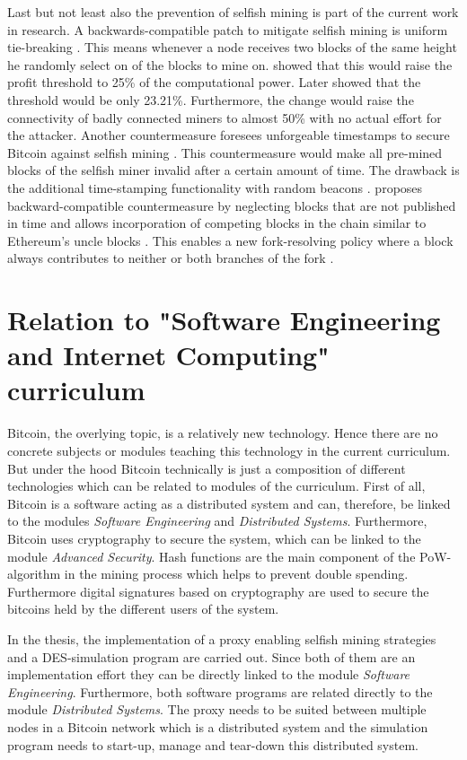 \documentclass{scrartcl}
\begin{document}
Last but not least also the prevention of selfish mining is part of the current work in research\cite{eyal2014majority, billah2015one, solat2016zeroblock, zhang2017publish}. A backwards-compatible patch to mitigate selfish mining is uniform tie-breaking \cite{eyal2014majority}. This means whenever a node receives two blocks of the same height he randomly select on of the blocks to mine on. \citep{eyal2014majority} showed that this would raise the profit threshold to 25\% of the computational power. Later \citep{sapirshtein2016optimal} showed that the threshold would be only 23.21\%. Furthermore, the change would raise the connectivity of badly connected miners to almost 50\% with no actual effort for the attacker. Another countermeasure foresees unforgeable timestamps to secure Bitcoin against selfish mining \citep{billah2015one}. This countermeasure would make all pre-mined blocks of the selfish miner invalid after a certain amount of time. The drawback is the additional time-stamping functionality with random beacons \citep{billah2015one}. \cite{zhang2017publish} proposes backward-compatible countermeasure by neglecting blocks that are not published in time and allows incorporation of competing blocks in the chain similar to Ethereum's uncle blocks \cite{Ethereum}. This enables a new fork-resolving policy where a block always contributes to neither or both branches of the fork \cite{zhang2017publish}.

\section{Relation to "Software Engineering and Internet Computing" curriculum}
Bitcoin, the overlying topic, is a relatively new technology. Hence there are no concrete subjects or modules teaching this technology in the current curriculum. But under the hood Bitcoin technically is just a composition of different technologies which can be related to modules of the curriculum. First of all, Bitcoin is a software acting as a distributed system and can, therefore, be linked to the modules \textit{Software Engineering} and \textit{Distributed Systems}. Furthermore, Bitcoin uses cryptography to secure the system, which can be linked to the module \textit{Advanced Security}. Hash functions are the main component of the PoW-algorithm in the mining process which helps to prevent double spending. Furthermore digital signatures based on cryptography are used to secure the bitcoins held by the different users of the system.

In the thesis, the implementation of a proxy enabling selfish mining strategies and a DES-simulation program are carried out. Since both of them are an implementation effort they can be directly linked to the module \textit{Software Engineering}. Furthermore, both software programs are related directly to the module \textit{Distributed Systems}. The proxy needs to be suited between multiple nodes in a Bitcoin network which is a distributed system and the simulation program needs to start-up, manage and tear-down this distributed system.


\end{document}
